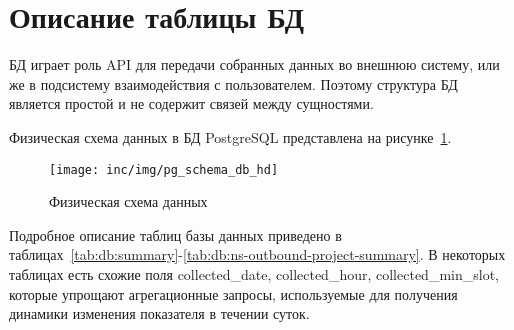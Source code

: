 \section{Описание таблицы БД}\label{sec:описание-таблицы-бд}

БД играет роль API для передачи собранных данных во внешнюю систему,
или же в подсистему взаимодействия с пользователем.
Поэтому структура БД является простой и не содержит связей между сущностями.

Физическая схема данных в БД PostgreSQL представлена на рисунке~\ref{pic:schema-db}.

\begin{figure}[!ht]
    \centering
    \texttt{[image: inc/img/pg\_schema\_db\_hd]}
    \caption{Физическая схема данных}
    \label{pic:schema-db}
\end{figure}

Подробное описание таблиц базы данных приведено в таблицах~\ref{tab:db:summary}-\ref{tab:db:ns-outbound-project-summary}.
В некоторых таблицах есть схожие поля collected\_date, collected\_hour, collected\_min\_slot,
которые упрощают агрегационные запросы, используемые для получения динамики изменения показателя в течении суток.

